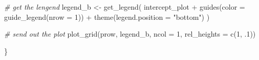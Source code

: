 \documentclass[
  man]{apa6}
\newenvironment{Shaded}{\begin{snugshade}}{\end{snugshade}}
\newcommand{\AttributeTok}[1]{\textcolor[rgb]{0.77,0.63,0.00}{#1}}
\newcommand{\CommentTok}[1]{\textcolor[rgb]{0.56,0.35,0.01}{\textit{#1}}}
\newcommand{\DecValTok}[1]{\textcolor[rgb]{0.00,0.00,0.81}{#1}}
\newcommand{\FunctionTok}[1]{\textcolor[rgb]{0.00,0.00,0.00}{#1}}
\newcommand{\NormalTok}[1]{#1}
\newcommand{\OtherTok}[1]{\textcolor[rgb]{0.56,0.35,0.01}{#1}}
\newcommand{\SpecialCharTok}[1]{\textcolor[rgb]{0.00,0.00,0.00}{#1}}
\newcommand{\StringTok}[1]{\textcolor[rgb]{0.31,0.60,0.02}{#1}}
\begin{document}
\begin{Shaded}
\begin{Highlighting}[]
  \CommentTok{\# get the lengend}
\NormalTok{  legend\_b }\OtherTok{\textless{}{-}} \FunctionTok{get\_legend}\NormalTok{(}
\NormalTok{    intercept\_plot }\SpecialCharTok{+} 
      \FunctionTok{guides}\NormalTok{(}\AttributeTok{color =} \FunctionTok{guide\_legend}\NormalTok{(}\AttributeTok{nrow =} \DecValTok{1}\NormalTok{)) }\SpecialCharTok{+}
      \FunctionTok{theme}\NormalTok{(}\AttributeTok{legend.position =} \StringTok{"bottom"}\NormalTok{)}
\NormalTok{  )}
  
  \CommentTok{\# send out the plot }
  \FunctionTok{plot\_grid}\NormalTok{(prow, legend\_b, }\AttributeTok{ncol =} \DecValTok{1}\NormalTok{, }\AttributeTok{rel\_heights =} \FunctionTok{c}\NormalTok{(}\DecValTok{1}\NormalTok{, .}\DecValTok{1}\NormalTok{))}
  
\NormalTok{\}}
\end{Highlighting}
\end{Shaded}

\normalsize
\end{document}
